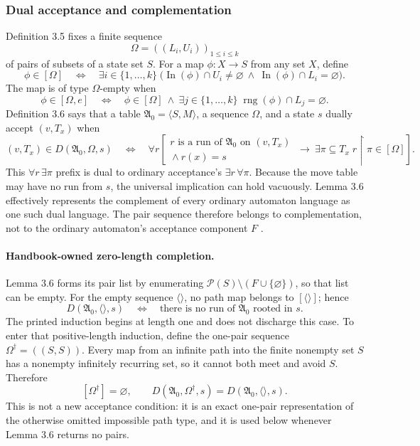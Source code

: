 \subsubsection{Dual acceptance and complementation}

Definition 3.5 fixes a finite sequence
\[
 \Omega=((L_i,U_i))_{1\leq i\leq k}
\]
of pairs of subsets of a state set \(S\).  For a map \(\phi:X\to S\) from any
set \(X\), define
\[
 \phi\in[\Omega]
 \quad\Longleftrightarrow\quad
 \exists i\in\{1,\ldots,k\}\;
 \bigl(
   \operatorname{In}(\phi)\cap U_i\neq\varnothing
   \ \land\
   \operatorname{In}(\phi)\cap L_i=\varnothing
 \bigr).
\]
The map is of type \(\Omega\)-empty when
\[
 \phi\in[\Omega,e]
 \quad\Longleftrightarrow\quad
 \phi\in[\Omega]
 \ \land\
 \exists j\in\{1,\ldots,k\}\;
   \operatorname{rng}(\phi)\cap L_j=\varnothing.
\]
Definition 3.6 says that a table \(\mathfrak A_0=\langle S,M\rangle\), a
sequence \(\Omega\), and a state \(s\) dually accept \((v,T_x)\) when
\[
 (v,T_x)\in D(\mathfrak A_0,\Omega,s)
 \quad\Longleftrightarrow\quad
 \forall r\left[
  \begin{array}{c}
   r\text{ is a run of }\mathfrak A_0\text{ on }(v,T_x)\\[-1mm]
   {}\land r(x)=s
  \end{array}
  \ \longrightarrow\
  \exists\pi\subseteq T_x\;
    r\mathbin{\upharpoonright}\pi\in[\Omega]
 \right].
\]
This \(\forall r\,\exists\pi\) prefix is dual to ordinary acceptance's
\(\exists r\,\forall\pi\).  Because the move table may have no run from
\(s\), the universal implication can hold vacuously.  Lemma 3.6 effectively
represents the complement of every ordinary automaton language as one such
dual language.  The pair sequence therefore belongs to complementation, not
to the ordinary automaton's acceptance component \(F\)
\cite[pp.~24--26]{Rabin1969}.

\paragraph{Handbook-owned zero-length completion.}
Lemma 3.6 forms its pair list by enumerating
\(\mathcal P(S)\setminus(F\cup\{\varnothing\})\), so that list can be empty.
For the empty sequence \(\langle\rangle\), no path map belongs to
\([\langle\rangle]\); hence
\[
 D(\mathfrak A_0,\langle\rangle,s)
 \quad\Longleftrightarrow\quad
 \text{there is no run of }\mathfrak A_0\text{ rooted in }s.
\]
The printed induction begins at length one and does not discharge this case.
To enter that positive-length induction, define the one-pair sequence
\(\Omega^{\dagger}=((S,S))\).  Every map from an infinite path into the
finite nonempty set \(S\) has a nonempty infinitely recurring set, so it
cannot both meet and avoid \(S\).  Therefore
\[
 [\Omega^{\dagger}]=\varnothing,
 \qquad
 D(\mathfrak A_0,\Omega^{\dagger},s)
   =D(\mathfrak A_0,\langle\rangle,s).
\]
This is not a new acceptance condition: it is an exact one-pair representation
of the otherwise omitted impossible path type, and it is used below whenever
Lemma 3.6 returns no pairs.


